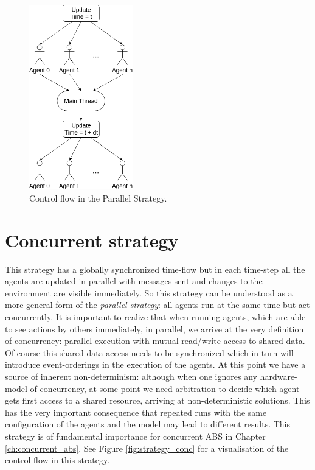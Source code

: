 \begin{figure}[H]
	\centering
	\includegraphics[width=0.4\textwidth, angle=0]{./fig/implabs/parallel.png}
	\caption{Control flow in the Parallel Strategy.}
	\label{fig:strategy_par}
\end{figure}

\section{Concurrent strategy}
\label{sub:con_strategy}
This strategy has a globally synchronized time-flow but in each time-step all the agents are updated in parallel with messages sent and changes to the environment are visible immediately. So this strategy can be understood as a more general form of the \textit{parallel strategy}: all agents run at the same time but act concurrently. It is important to realize that when running agents, which are able to see actions by others immediately, in parallel, we arrive at the very definition of concurrency: parallel execution with mutual read/write access to shared data. Of course this shared data-access needs to be synchronized which in turn will introduce event-orderings in the execution of the agents. At this point we have a source of inherent non-determinism: although when one ignores any hardware-model of concurrency, at some point we need arbitration to decide which agent gets first access to a shared resource, arriving at non-deterministic solutions. This has the very important consequence that repeated runs with the same configuration of the agents and the model may lead to different results. This strategy is of fundamental importance for concurrent ABS in Chapter \ref{ch:concurrent_abs}. See Figure \ref{fig:strategy_conc} for a visualisation of the control flow in this strategy.

